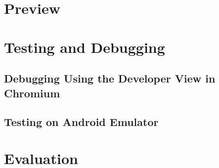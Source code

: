 \documentclass[10pt, a4paper]{article}
\begin{document}
\section{Preview}

\section{Testing and Debugging}

\subsection{Debugging Using the Developer View in Chromium}


\subsection{Testing on Android Emulator}


\section{Evaluation}
\end{document}
